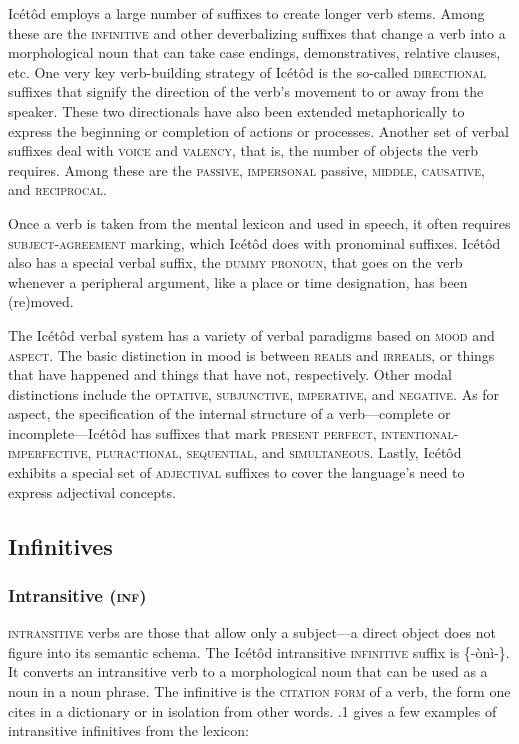 Icétôd employs a large number of suffixes to create longer verb stems. Among these are the \textsc{infinitive} and other deverbalizing suffixes that change a verb into a morphological noun that can take case endings, demonstratives, relative clauses, etc. One very key verb-building strategy of Icétôd is the so-called \textsc{directional} suffixes that signify the direction of the verb’s movement to or away from the speaker. These two directionals have also been extended metaphorically to express the beginning or completion of actions or processes. Another set of verbal suffixes deal with \textsc{voice} and \textsc{valency}, that is, the number of objects the verb requires. Among these are the \textsc{passive}, \textsc{impersonal} passive, \textsc{middle}, \textsc{causative}, and \textsc{reciprocal}.

Once a verb is taken from the mental lexicon and used in speech, it often requires \textsc{subject-agreement} marking, which Icétôd does with pronominal suffixes. Icétôd also has a special verbal suffix, the \textsc{dummy} \textsc{pronoun}, that goes on the verb whenever a peripheral argument, like a place or time designation, has been (re)moved.

The Icétôd verbal system has a variety of verbal paradigms based on \textsc{mood} and \textsc{aspect}. The basic distinction in mood is between \textsc{realis} and \textsc{irrealis}, or things that have happened and things that have not, respectively. Other modal distinctions include the \textsc{optative}, \textsc{subjunctive}, \textsc{imperative}, and \textsc{negative}. As for aspect, the specification of the internal structure of a verb—complete or incomplete—Icétôd has suffixes that mark \textsc{present perfect}, \textsc{intentional}{}-\textsc{imperfective}, \textsc{pluractional}, \textsc{sequential}, and \textsc{simultaneous}. Lastly, Icétôd exhibits a special set of \textsc{adjectival} suffixes to cover the language’s need to express adjectival concepts.




\subsection{Infinitives}
\subsubsection{Intransitive (\textsc{inf})}

\textsc{intransitive} verbs are those that allow only a subject—a direct object does not figure into its semantic schema. The Icétôd intransitive \textsc{infinitive} suffix is \{-ònì-\}. It converts an intransitive verb to a morphological noun that can be used as a noun in a noun phrase. The infinitive is the \textsc{citation} \textsc{form} of a verb, the form one cites in a dictionary or in isolation from other words. .1 gives a few examples of intransitive infinitives from the lexicon:


